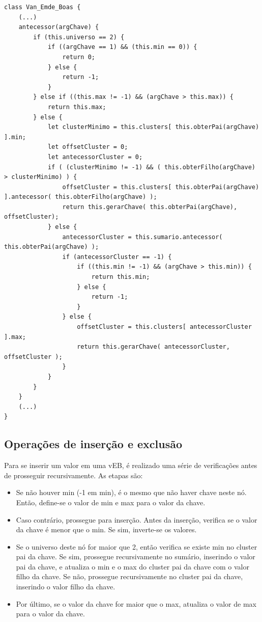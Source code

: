 \documentclass[12pt]{article}
\begin{document}
\begin{verbatim}
class Van_Emde_Boas {
    (...)
    antecessor(argChave) {
        if (this.universo == 2) {
            if ((argChave == 1) && (this.min == 0)) {
                return 0;
            } else {
                return -1;
            }
        } else if ((this.max != -1) && (argChave > this.max)) {
            return this.max;
        } else {
            let clusterMinimo = this.clusters[ this.obterPai(argChave) ].min;
            let offsetCluster = 0;
            let antecessorCluster = 0;
            if ( (clusterMinimo != -1) && ( this.obterFilho(argChave) > clusterMinimo) ) {
                offsetCluster = this.clusters[ this.obterPai(argChave) ].antecessor( this.obterFilho(argChave) );
                return this.gerarChave( this.obterPai(argChave), offsetCluster);
            } else {
                antecessorCluster = this.sumario.antecessor( this.obterPai(argChave) );
                if (antecessorCluster == -1) {
                    if ((this.min != -1) && (argChave > this.min)) {
                        return this.min;
                    } else {
                        return -1;
                    }
                } else {
                    offsetCluster = this.clusters[ antecessorCluster ].max;
                    return this.gerarChave( antecessorCluster, offsetCluster );
                }
            }
        }
    }
    (...)
}
\end{verbatim}

\subsection{Operações de inserção e exclusão}

Para se inserir um valor em uma vEB, é realizado uma série de verificações antes de prosseguir recursivamente. As etapas são:
\begin{itemize}
    \item Se não houver min (-1 em min), é o mesmo que não haver chave neste nó. Então, define-se o valor de min e max para o valor da chave.
    \item Caso contrário, prossegue para inserção. Antes da inserção, verifica se o valor da chave é menor que o min. Se sim, inverte-se os valores.
    \item Se o universo deste nó for maior que 2, então verifica se existe min no cluster pai da chave. Se sim, prossegue recursivamente no sumário, inserindo o valor pai da chave, e atualiza o min e o max do cluster pai da chave com o valor filho da chave. Se não, prossegue recursivamente no cluster pai da chave, inserindo o valor filho da chave.
    \item Por último, se o valor da chave for maior que o max, atualiza o valor de max para o valor da chave.
\end{itemize}
\end{document}
